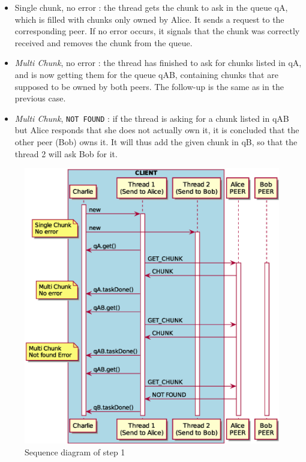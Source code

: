 \begin{itemize}
	\item Single chunk, no error : the thread gets the chunk to ask in the queue qA, which is filled with chunks only owned by Alice. It sends a request to the corresponding peer. If no error occurs, it signals that the chunk was correctly received and removes the chunk from the queue.
	
	\item \textit{Multi Chunk}, no error : the thread has finished to ask for chunks listed in qA, and is now getting them for the queue qAB, containing chunks that are supposed to be owned by both peers. The follow-up is the same as in the previous case.
	
	\item \textit{Multi Chunk}, \texttt{NOT FOUND} : if the thread is asking for a chunk listed in qAB but Alice responds that she does not actually own it, it is concluded that the other peer (Bob) owns it. It will thus add the given chunk in qB, so that the thread 2 will ask Bob for it.
\end{itemize}

\begin{figure}
	\centering
	\includegraphics[width=\textwidth]{img/step1.eps}
	\caption{Sequence diagram of step 1}
	\label{fig:step1}
\end{figure}